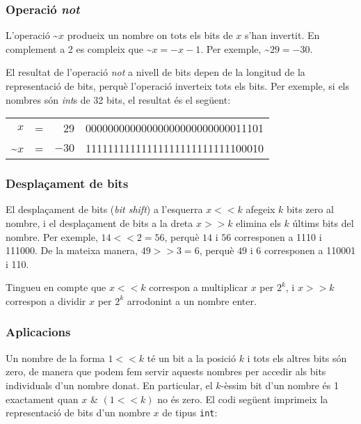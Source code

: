 \subsubsection{Operació \emph{not}}


L'operació  \textasciitilde$x$ produeix un nombre on tots els
bits de $x$ s'han invertit. En complement a 2 es compleix que
\textasciitilde$x = -x-1$. Per exemple, \textasciitilde$29 = -30$.

El resultat de l'operació \emph{not} a nivell de bits depen de la
longitud de la representació de bits, perquè l'operació inverteix tots
els bits. Per exemple, si els nombres són \emph{int}s de 32 bits, el
resultat és el següent:


\begin{center}
\begin{tabular}{rrrr}
$x$ & = & 29 &   00000000000000000000000000011101 \\
\textasciitilde$x$ & = & $-30$ & 11111111111111111111111111100010 \\
\end{tabular}
\end{center}


\subsubsection{Desplaçament de bits}


El desplaçament de bits (\emph{bit shift}) a l'esquerra $x < < k$
afegeix $k$ bits zero al nombre, i el desplaçament de bits a la dreta
$x > > k$ elimina els $k$ últims bits del nombre. Per exemple, $14 < <
2 = 56$, perquè $14$ i $56$ corresponen a 1110 i 111000. De la mateixa
manera, $49 > > 3 = 6$, perquè $49$ i $6$ corresponen a 110001 i 110.

Tingueu en compte que $x < < k$ correspon a multiplicar $x$ per $2^k$,
i $x > > k$ correspon a dividir $x$ per $2^k$ arrodonint a un nombre
enter.

\subsubsection{Aplicacions}

Un nombre de la forma $1 < < k$ té un bit a la posició $k$ i tots els
altres bits són zero, de manera que podem fem servir aquests nombres
per accedir als bits individuals d'un nombre donat. En particular, el
$k$-èssim bit d'un nombre és 1 exactament quan $x$ \& $(1 < < k)$ no
és zero. El codi següent imprimeix la representació de bits d'un
nombre $x$ de tipus \texttt{int}:


